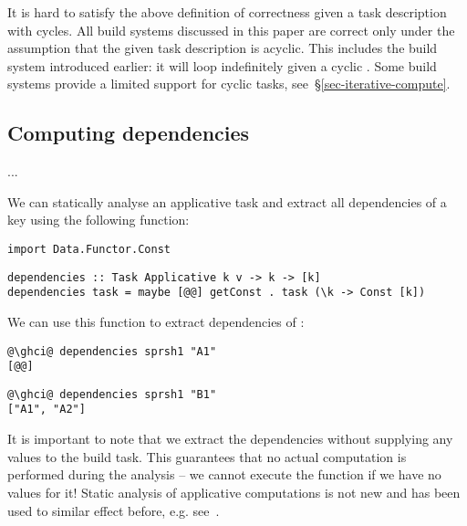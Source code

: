 It is hard to satisfy the above definition of correctness given a task
description with cycles. All build systems discussed in this paper are correct
only under the assumption that the given task description is acyclic. This
includes the  build system introduced earlier: it will loop
indefinitely given a cyclic . Some build systems provide a limited
support for cyclic tasks, see~\S\ref{sec-iterative-compute}.

\subsection{Computing dependencies}\label{sec-deps}


...

We can statically analyse an applicative task and extract all dependencies of a
key using the following function:

\vspace{1mm}
\begin{verbatim}
import Data.Functor.Const
\end{verbatim}
\vspace{0.5mm}
\begin{verbatim}
dependencies :: Task Applicative k v -> k -> [k]
dependencies task = maybe [@@] getConst . task (\k -> Const [k])
\end{verbatim}
\vspace{1mm}

\noindent
We can use this function to extract dependencies of :

\vspace{1mm}
\begin{verbatim}
@\ghci@ dependencies sprsh1 "A1"
[@@]
\end{verbatim}
\begin{verbatim}
@\ghci@ dependencies sprsh1 "B1"
["A1", "A2"]
\end{verbatim}
\vspace{1mm}

\noindent
It is important to note that we extract the dependencies without supplying any
values to the build task. This guarantees that no actual computation is performed
during the analysis -- we cannot execute the function \hs{(+)} if we have no
values for it! Static analysis of applicative computations is not new and has
been used to similar effect before, e.g. see~\cite{free-applicatives}.

